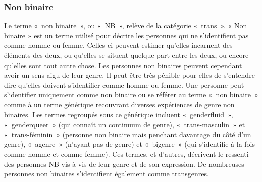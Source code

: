 \documentclass[12pt,openany]{book}
\begin{document}
\begin{figure}[h]
    \centering
\end{figure}

\subsubsection*{Non binaire}

\noindent Le terme \mbox{« n}on binair\mbox{e »}, ou \mbox{« NB »}, relève de la catégorie \mbox{« trans »}. « Non binaire » est un terme utilisé pour décrire les personnes qui ne s’identifient pas comme homme ou femme. Celles-ci peuvent estimer qu’elles incarnent des éléments des deux, ou qu’elles se situent quelque part entre les deux, ou encore qu’elles sont tout autre chose. Les personnes non binaires peuvent cependant avoir un sens aigu de leur genre. Il peut être très pénible pour elles de s’entendre dire qu’elles doivent s’identifier comme homme ou femme. Une personne peut s’identifier uniquement comme non binaire ou se référer au terme \mbox{« n}on binair\mbox{e »} comme à un terme générique recouvrant diverses expériences de genre non binaires. Les termes regroupés sous ce générique incluent \mbox{« genderfluid »}, \mbox{« genderqueer »} (qui connaît un continuum de genre), \mbox{« t}rans-masculi\mbox{n »} et \mbox{« t}rans-fémini\mbox{n »} (personne non binaire mais penchant davantage du côté d’un genre), \mbox{« agenre »} (n’ayant pas de genre) et \mbox{« bigenre »} (qui s’identifie à la fois comme homme et comme femme). Ces termes, et d’autres, décrivent le ressenti des personnes NB vis-à-vis de leur genre et de son expression. De nombreuses personnes non binaires s’identifient également comme transgenres.
\end{document}

